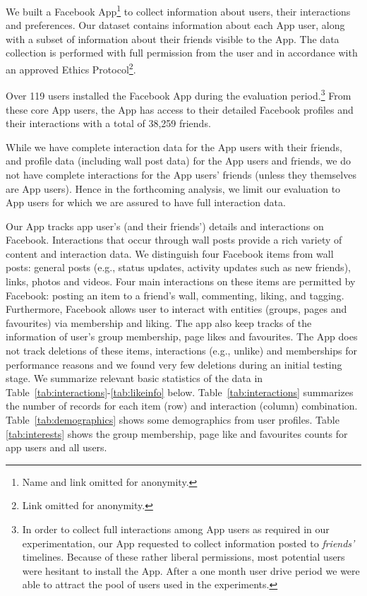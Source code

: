 
We built a Facebook App\footnote{Name and link omitted
for anonymity.} to collect information about users, 
their interactions and preferences.  
Our dataset contains information about each App user, along with a
subset of information about their friends visible to the App.  The
data collection is performed with full permission from the user and in
accordance with an approved Ethics Protocol\footnote{Link omitted for
anonymity.}.

Over 119 users installed the Facebook App during the evaluation
period.\footnote{In order to collect full interactions among App users
as required in our experimentation, our App requested to
collect information posted to \emph{friends'} timelines.  Because of
these rather liberal permissions, most potential users were hesitant
to install the App.  After a one month user
drive period we were able to attract the pool of users used in the
experiments.}  From these core App users, the App has access to their
detailed Facebook profiles and their interactions with a total of
38,259 friends.

While we have complete interaction data for the App
users with their friends, and profile data (including
wall post data) for the App users and friends, we do not have complete
interactions for the App users' friends (unless they themselves are
App users).  Hence in the forthcoming analysis, we limit our
evaluation to App users for which we are assured to have full
interaction data.

Our App tracks app user's (and their friends') details and interactions
on Facebook.  Interactions that occur through wall posts provide a
rich variety of content and interaction data.  We distinguish four
Facebook items from wall posts: general posts (e.g., status updates,
activity updates such as new friends), links, photos and videos. Four main
interactions on these items are permitted by Facebook: posting an item
to a friend's wall, commenting, liking, and tagging. Furthermore, Facebook allows user to interact with
entities (groups, pages and favourites) via membership and liking. The app also keep tracks of the information 
of user's group membership, page likes and favourites.
The App does not track deletions of these items, interactions (e.g., unlike) and memberships for
performance reasons and we found very few deletions during an initial
testing stage.
We summarize relevant basic statistics of the data in Table~\ref{tab:interactions}-\ref{tab:likeinfo} below.
Table~\ref{tab:interactions}
summarizes the number of records for each item (row) and interaction (column)
combination. Table~\ref{tab:demographics} shows 
some demographics from user profiles. Table \ref{tab:interests} shows the group membership, page like and favourites counts for app users and  all users.

